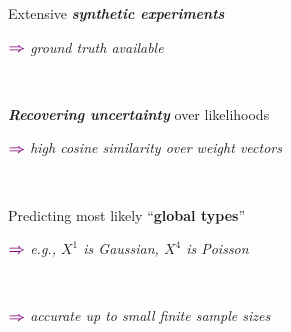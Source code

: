 \documentclass[xcolor={usenames,dvipsnames,svgnames}, compress, aspectratio=169, 11pt]{beamer}
\newcommand{\comment}[3][\small]{\begin{minipage}{1\linewidth}
          \raggedleft
          {
            $\color{violet}\boldsymbol\Rightarrow$
            #1
            {\emph{#2}}
          }
      \end{minipage}#3\\
}
\begin{document}
\begin{frame}[t, htt=bgrey2]
\begin{minipage}[t]{0.45\linewidth}
  \end{minipage}\hfill\begin{minipage}[t]{0.5\linewidth}
    \raggedright
    \vspace{20pt}

    Extensive \emph{\textbf{\textbf{synthetic experiments}}}\\
    \comment[\small]{ground truth available}{}
    \vspace{15pt}
    
    \emph{\textbf{Recovering uncertainty}} over likelihoods\\
     \comment[\small]{high cosine similarity over weight vectors}{}
    \vspace{15pt}

    Predicting most likely ``\textbf{global types}''\\
    \comment[\small]{e.g., $X^{1}$ is Gaussian, $X^{4}$ is Poisson}{}
    \vspace{-1pt}
    \comment[\small]{accurate up to small finite sample sizes}{}
    
  \end{minipage}\hfill\begin{minipage}[t]{0.3\linewidth}
    \vspace{-150pt}
    
  \end{minipage}
  
\end{frame}
\end{document}
